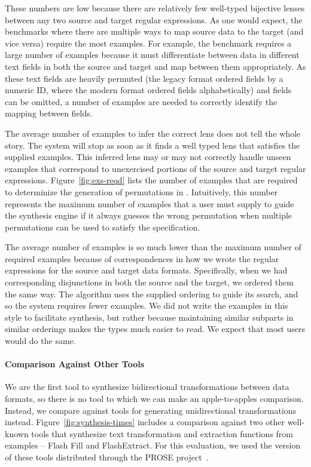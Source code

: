 \documentclass[12pt]{article}
\begin{document}
{These numbers are low because there are relatively few well-typed
bijective lenses between any two source and target regular expressions. 
As one would expect, the benchmarks where there are multiple ways to
map source data to the target (and vice versa) require the most examples.
For example, the benchmark  requires a large number of
examples because it
must differentiate between data in different text fields in both the
source and target and map between them appropriately.  As these text fields are
heavily permuted
(the legacy format ordered fields by a numeric ID, where
the modern format ordered fields alphabetically) and fields can be
omitted, a number of examples are needed to correctly identify the mapping
between fields.

The average number of examples to
infer the correct lens does not tell the whole story.  The system will
stop as soon as it finds a well typed lens that satisfies the supplied examples.
This inferred lens may or may not 
correctly handle unseen examples that correspond to
unexercised portions of the source and target regular expressions.
Figure~\ref{fig:exs-reqd} lists
the number of examples that are required to determinize the generation of
permutations in \RigidSynth{}.
Intuitively, this number represents the maximum number of
examples that a user must supply to guide the synthesis engine if it
always guesses the wrong permutation when multiple permutations can be used to
satisfy the specification. 

The average number of examples is so much lower than the maximum
number of required examples because of correspondences in how we wrote
the regular expressions for the source and target data formats. 
Specifically, when we had corresponding disjunctions in both the
source and the target, we ordered them the same way.  The algorithm
uses the supplied ordering to guide its search, and so the system
requires fewer examples.   We did not write the examples in this style
to facilitate synthesis, but rather because maintaining similar
subparts in similar orderings makes the types much easier to 
read. We expect that most users would do the same.

\paragraph*{Comparison Against Other Tools}
%
We are the first tool to synthesize bidirectional transformations between data
formats, so there is no tool to which we can make an apple-to-apples comparison.
Instead, we compare against tools for generating unidirectional
transformations instead. 
Figure~\ref{fig:synthesis-times} includes a comparison against two other
well-known tools that synthesize
text transformation and extraction functions from examples -- Flash Fill and FlashExtract.  For this
evaluation, we used the version of these tools distributed through the
PROSE project~\cite{prose}.

}
\end{document}
